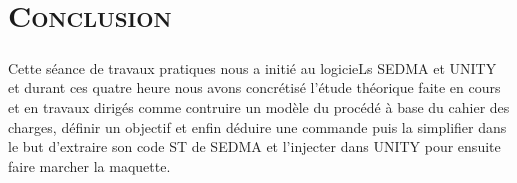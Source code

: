 \chapter*{\textsc{Conclusion}}
 
 \paragraph{} Cette séance de travaux pratiques nous a initié au logicieLs SEDMA et UNITY et durant ces quatre heure nous avons concrétisé l'étude théorique faite en cours et en travaux dirigés comme contruire un modèle du procédé à base du cahier des charges, définir un objectif et enfin déduire une commande puis la simplifier dans le but  d'extraire son code ST de SEDMA et l'injecter dans UNITY pour ensuite faire marcher la maquette.    